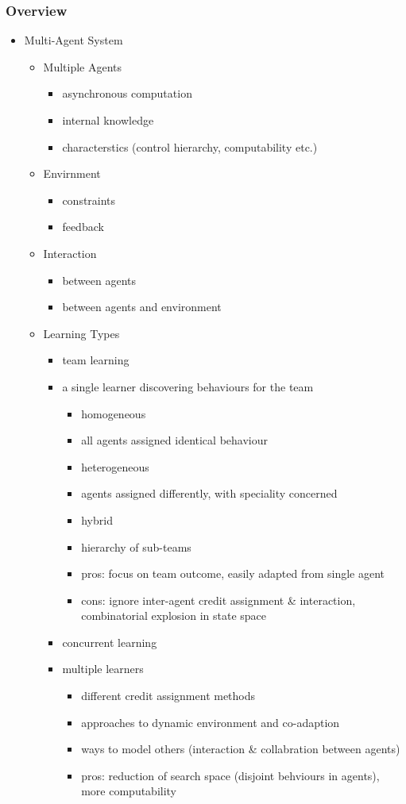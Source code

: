 \subsubsection{Overview}
\begin{itemize}
\item Multi-Agent System
	\begin{itemize}
	\item Multiple Agents
		\begin{itemize}
		\item asynchronous computation
		\item internal knowledge
		\item characterstics (control hierarchy, computability etc.)
		\end{itemize}
	\item Envirnment
		\begin{itemize}
		\item constraints
		\item feedback
		\end{itemize}
	\item Interaction
		\begin{itemize}
		\item between agents
		\item between agents and environment
		\end{itemize}
	\item Learning Types
		\begin{itemize}
		\item team learning\item a single learner discovering behaviours for the team
			\begin{itemize}
			\item homogeneous\item all agents assigned identical behaviour
			\item heterogeneous\item agents assigned differently, with speciality concerned
			\item hybrid\item hierarchy of sub-teams
			\item pros: focus on team outcome, easily adapted from single agent
			\item cons: ignore inter-agent credit assignment \& interaction, combinatorial explosion in state space
			\end{itemize}
		\item concurrent learning\item multiple learners
			\begin{itemize}
			\item different credit assignment methods
			\item approaches to dynamic environment and co-adaption
			\item ways to model others (interaction \& collabration between agents)
			\item pros: reduction of search space (disjoint behviours in agents), more computability
			\end{itemize}
		\end{itemize}
	\end{itemize}


\end{itemize}
